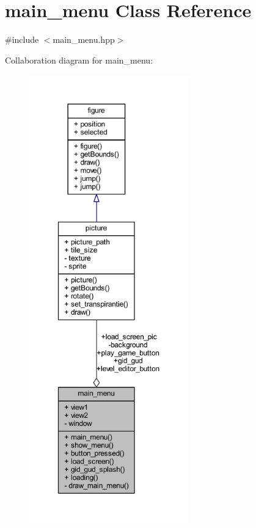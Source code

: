 \hypertarget{classmain__menu}{}\section{main\+\_\+menu Class Reference}
\label{classmain__menu}


{\ttfamily \#include $<$main\+\_\+menu.\+hpp$>$}



Collaboration diagram for main\+\_\+menu\+:
\nopagebreak
\begin{figure}[H]
\begin{center}
\leavevmode
\includegraphics[height=550pt]{classmain__menu__coll__graph}
\end{center}
\end{figure}
